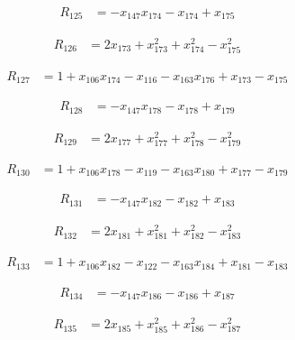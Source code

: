 \begin{align*}
R_{125} &= -x_{147} x_{174} -x_{174} +x_{175}
\end{align*}

\begin{align*}
R_{126} &= 2 x_{173} +x_{173}^{2} +x_{174}^{2} -x_{175}^{2}
\end{align*}

\begin{align*}
R_{127} &= 1 +x_{106} x_{174} -x_{116} -x_{163} x_{176} +x_{173} -x_{175}
\end{align*}

\begin{align*}
R_{128} &= -x_{147} x_{178} -x_{178} +x_{179}
\end{align*}

\begin{align*}
R_{129} &= 2 x_{177} +x_{177}^{2} +x_{178}^{2} -x_{179}^{2}
\end{align*}

\begin{align*}
R_{130} &= 1 +x_{106} x_{178} -x_{119} -x_{163} x_{180} +x_{177} -x_{179}
\end{align*}

\begin{align*}
R_{131} &= -x_{147} x_{182} -x_{182} +x_{183}
\end{align*}

\begin{align*}
R_{132} &= 2 x_{181} +x_{181}^{2} +x_{182}^{2} -x_{183}^{2}
\end{align*}

\begin{align*}
R_{133} &= 1 +x_{106} x_{182} -x_{122} -x_{163} x_{184} +x_{181} -x_{183}
\end{align*}

\begin{align*}
R_{134} &= -x_{147} x_{186} -x_{186} +x_{187}
\end{align*}

\begin{align*}
R_{135} &= 2 x_{185} +x_{185}^{2} +x_{186}^{2} -x_{187}^{2}
\end{align*}

